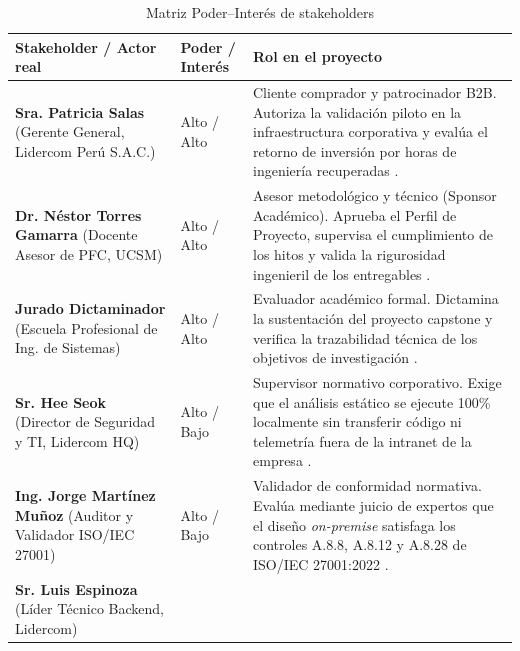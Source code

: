 \begin{table}[H]
\centering
\caption{Matriz Poder--Interés de stakeholders}
\label{tab:stakeholders}
\small
{}
\begin{tabularx}{\textwidth}{>{\raggedright\arraybackslash}p{4.2cm} >{\centering\arraybackslash}p{2.6cm} >{\raggedright\arraybackslash}X}
\toprule
\textbf{Stakeholder / Actor real} & \textbf{Poder / Interés} & \textbf{Rol en el proyecto} \\
\midrule
\textbf{Sra. Patricia Salas} \newline (Gerente General, Lidercom Perú S.A.C.) & 
Alto / Alto & 
Cliente comprador y patrocinador B2B. Autoriza la validación piloto en la infraestructura corporativa y evalúa el retorno de inversión por horas de ingeniería recuperadas \parencite{pmi2021pmbok}. \\ %
\addlinespace
\textbf{Dr. Néstor Torres Gamarra} \newline (Docente Asesor de PFC, UCSM) & 
Alto / Alto & 
Asesor metodológico y técnico (Sponsor Académico). Aprueba el Perfil de Proyecto, supervisa el cumplimiento de los hitos y valida la rigurosidad ingenieril de los entregables \parencite{torres2026proyecto}. \\ %
\addlinespace
\textbf{Jurado Dictaminador} \newline (Escuela Profesional de Ing. de Sistemas) & 
Alto / Alto & 
Evaluador académico formal. Dictamina la sustentación del proyecto capstone y verifica la trazabilidad técnica de los objetivos de investigación \parencite{torres2026proyecto}. \\ %
\addlinespace
\textbf{Sr. Hee Seok} \newline (Director de Seguridad y TI, Lidercom HQ) & 
Alto / Bajo & 
Supervisor normativo corporativo. Exige que el análisis estático se ejecute 100\% localmente sin transferir código ni telemetría fuera de la intranet de la empresa \parencite{ladisa2023sok}. \\ %
\addlinespace
\textbf{Ing. Jorge Martínez Muñoz} \newline (Auditor y Validador ISO/IEC 27001) & 
Alto / Bajo & 
Validador de conformidad normativa. Evalúa mediante juicio de expertos que el diseño \textit{on-premise} satisfaga los controles A.8.8, A.8.12 y A.8.28 de ISO/IEC 27001:2022 \parencite{gutierrez2024auditoria}. \\ %
\addlinespace
\textbf{Sr. Luis Espinoza} \newline (Líder Técnico Backend, Lidercom) & 

\end{tabularx}
\end{table}
